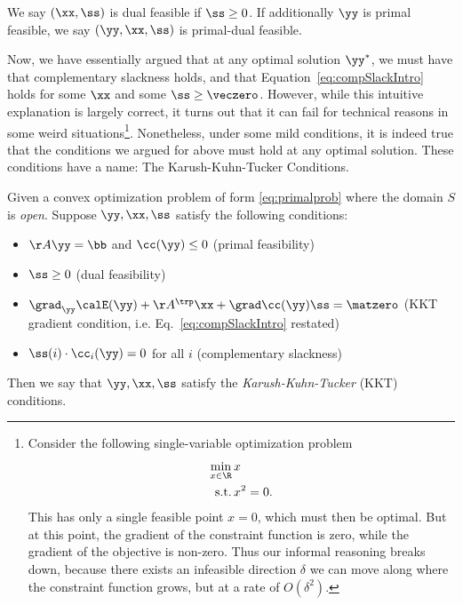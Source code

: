 \begin{definition}
We say $(\xx, \ss)$ is dual feasible if $\ss \geq 0$.
If additionally $\yy$ is primal feasible, we say $(\yy, \xx, \ss)$ is primal-dual feasible.
\end{definition}

Now, we have essentially argued that at any optimal solution
$\yy^*$, we must have that complementary slackness holds, and that
Equation~\eqref{eq:compSlackIntro} holds for some $\xx$ and some $\ss
\geq \veczero$.
However, while this intuitive explanation is largely correct, it turns
out that it can fail for technical reasons in some weird
situations\footnote{
  Consider the following single-variable optimization problem
  \begin{align*}
    \min_{x
    \in \R} &\, x
    \\
    \text{s.t.} & \, x^2 = 0.
  \end{align*}
  This has only a single feasible point $x = 0$, which must then be
  optimal.
  But at this point, the gradient of the constraint function is zero,
  while the gradient of the objective is non-zero.
  Thus our informal reasoning breaks down, because there exists an infeasible
  direction $\delta$ we can move along where the constraint function grows, but
  at a rate of $O(\delta^2)$.
  }.
Nonetheless, under some mild conditions, it is indeed true that the 
conditions we argued for above must hold at any optimal solution.
These conditions have a name: The Karush-Kuhn-Tucker Conditions.

\begin{definition}
  Given a convex optimization problem of form
  \eqref{eq:primalprob} where the domain $S$ is \emph{open}.
  Suppose $\yy, \xx, \ss$ satisfy the following conditions:
  \begin{itemize}
  \item $\AA\yy = \bb$ and $\cc(\yy) \leq 0$ \hfill (primal feasibility)
  \item $\ss \geq 0$ \hfill (dual feasibility)
  \item $\grad_{\yy}\calE(\yy) + \AA^\trp\xx +
    \grad\cc(\yy) \ss = \matzero$ \hfill
    (KKT gradient condition, i.e. Eq.~\eqref{eq:compSlackIntro} restated)
  \item $\ss(i)\cdot\cc_i(\yy) = 0$ for all $i$ \hfill (complementary slackness)
  \end{itemize}
  Then we say that $\yy, \xx, \ss$ satisfy the  \emph{Karush-Kuhn-Tucker} (KKT) conditions.
\end{definition}

